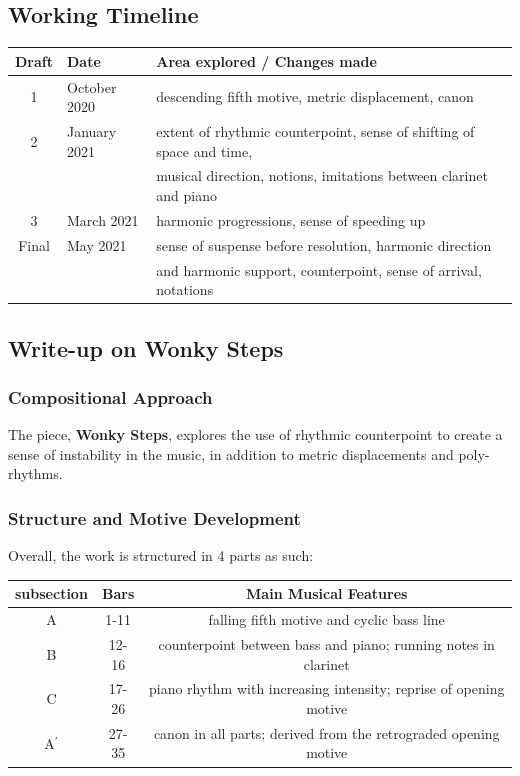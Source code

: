 \documentclass{article}
\begin{document}
\newpage

\subsection{Working Timeline}
\begin{center}
	\def\arraystretch{1.5}
\begin{tabular}{|c|l|l|}
	\hline
	Draft&Date&Area explored / Changes made\\
	\hline
	1&October 2020&
    descending fifth motive, metric displacement, canon\\
	\hline
	2&
    January 2021&extent of rhythmic counterpoint, sense of shifting of space and time,\\
    &&musical direction, notions, imitations between clarinet and piano\\
	\hline
	3&March 2021&harmonic progressions, sense of speeding up\\
	\hline
	Final&May 2021&sense of suspense before resolution, harmonic direction\\
    &&and harmonic support, counterpoint, sense of arrival, notations\\
	\hline
\end{tabular}
\end{center}

\subsection{Write-up on {\bf Wonky Steps}}

\subsubsection{Compositional Approach}
The piece, {\bf Wonky Steps}, explores the use of rhythmic counterpoint to create a sense of instability in the music, in addition to metric displacements and poly-rhythms.

\subsubsection{Structure and Motive Development}
Overall, the work is structured in 4 parts as such:

\begin{center}
	\def\arraystretch{1.5}
\begin{tabular}{|c|c|c|}
	\hline
	subsection&Bars&Main Musical Features\\
	\hline
	A&1-11&falling fifth motive and cyclic bass line\\
	\hline
	B&12-16&counterpoint between bass and piano; running notes in clarinet\\
	\hline
	C&17-26&piano rhythm with increasing intensity; reprise of opening motive\\
	\hline
	A\(^\prime\)&27-35&canon in all parts; derived from the retrograded opening motive\\
	\hline
\end{tabular}
\end{center}
\end{document}
